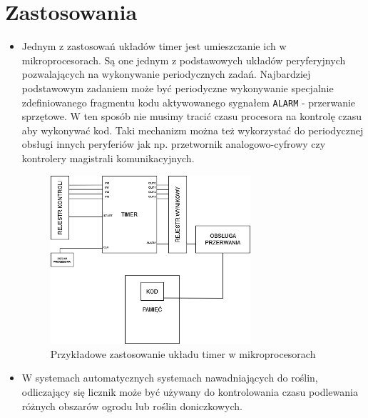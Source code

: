 \documentclass[a4paper]{article}
\begin{document}
\section{Zastosowania}
\begin{itemize}
    \item Jednym z zastosowań układów timer jest umieszczanie ich w mikroprocesorach. Są one jednym 
            z podstawowych układów peryferyjnych pozwalających na wykonywanie periodycznych 
            zadań. Najbardziej podstawowym zadaniem może być periodyczne wykonywanie specjalnie
            zdefiniowanego fragmentu kodu aktywowanego sygnałem \verb|ALARM| - przerwanie sprzętowe.
            W ten sposób nie musimy tracić czasu procesora na kontrolę czasu aby wykonywać kod. 
            Taki mechanizm można też wykorzystać do periodycznej obsługi innych peryferiów jak np.
            przetwornik analogowo-cyfrowy czy kontrolery magistrali komunikacyjnych.
    \begin{figure}[H]
        \centering
        \includegraphics[width=0.7\textwidth]{timer_use_mcu.png}
        \caption{Przykładowe zastosowanie układu timer w mikroprocesorach}
    \end{figure}

    \item W systemach automatycznych systemach nawadniających do roślin,
    odliczający się licznik może być używany do kontrolowania czasu podlewania różnych obszarów ogrodu lub roślin doniczkowych.


\end{itemize}
\end{document}
